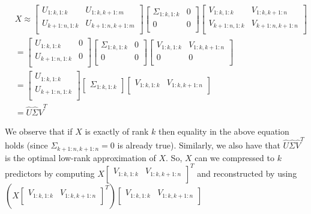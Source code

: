 \documentclass[conference]{IEEEtran}
\begin{document}
\begin{align*}
& X \approx 
\begin{bmatrix}
U_{1:k,1:k} & U_{1:k,k+1:m} \\
U_{k+1:n,1:k} & U_{k+1:n,k+1:m} \\
\end{bmatrix}
\begin{bmatrix}
\Sigma_{1:k,1:k} & 0 \\
0 & 0 \\
\end{bmatrix}
\begin{bmatrix}
V_{1:k,1:k} & V_{1:k,k+1:n} \\
V_{k+1:n,1:k} & V_{k+1:n,k+1:n} \\
\end{bmatrix} \\
& = 
\begin{bmatrix}
U_{1:k,1:k} & 0 \\
U_{k+1:n,1:k} & 0 \\
\end{bmatrix}
\begin{bmatrix}
\Sigma_{1:k,1:k} & 0 \\
0 & 0 \\
\end{bmatrix}
\begin{bmatrix}
V_{1:k,1:k} & V_{1:k,k+1:n} \\
0 & 0 \\
\end{bmatrix} \\
& = 
\begin{bmatrix}
U_{1:k,1:k} \\
U_{k+1:n,1:k} \\
\end{bmatrix}
\begin{bmatrix}
\Sigma_{1:k,1:k}
\end{bmatrix}
\begin{bmatrix}
V_{1:k,1:k} & V_{1:k,k+1:n} \\
\end{bmatrix} \\
& = \hat{U} \hat{\Sigma} \hat{V}^T
\end{align*}

We observe that if $X$ is exactly of rank $k$ then equality in the above equation holds (since $\Sigma_{k+1:n,k+1:n}=0$ is already true).  Similarly, we also have that $\hat{U} \hat{\Sigma} \hat{V}^T$ is the optimal low-rank approximation of $X$.  So, $X$ can we compressed to $k$ predictors by computing $X \begin{bmatrix} V_{1:k,1:k} & V_{1:k,k+1:n} \\ \end{bmatrix}^T$ and reconstructed by using $(X \begin{bmatrix} V_{1:k,1:k} & V_{1:k,k+1:n} \\ \end{bmatrix}^T) \begin{bmatrix} V_{1:k,1:k} & V_{1:k,k+1:n} \\ \end{bmatrix}$
\end{document}
